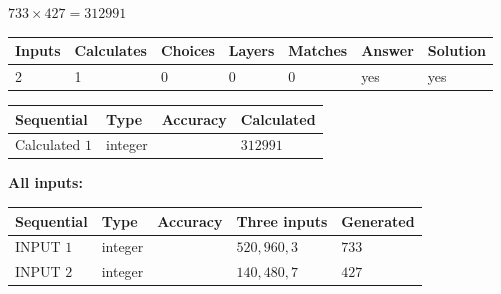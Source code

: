 \documentclass{ctexart}
\begin{document}
 

$ %
733 \times  %
427=   %
312991$
 
 
\noindent{}
 
 

 
   
   
   
   
\noindent\begin{tabular}{|l|l|l|l|l|l|l|}
 \hline
Inputs & Calculates & Choices & Layers & Matches & Answer & Solution \\ \hline
 2  & 
 1  & 
 0
  & 
 0  & 
 0  & 
  yes & 
  yes 
  \\ \hline
 \end{tabular}
   
   
   
   
\noindent{}
   
   
  
  
\noindent\begin{tabular}{|l|l|l|l|}
\hline
 Sequential & Type & Accuracy & Calculated \\ 
\hline
 
 
  Calculated $  1 $ & integer &  & 
  $ 312991 $ 
 \\  \hline  
 \end{tabular}
   
   
   
   
\noindent\vspace{0.1in}\hspace{-0.08in} {\textbf{\Large{All inputs: }}}
   
   
  
  
\noindent\begin{tabular}{|l|l|l|l|l|}
\hline
 Sequential & Type & Accuracy & Three inputs & Generated \\ 
\hline
 
 
  INPUT $  1 $ & integer &  & $
 520
 , 
 960
 , 
 3
 $ & $ 733 $ 
 \\  \hline  
 
 
  INPUT $  2 $ & integer &  & $
 140
 , 
 480
 , 
 7
 $ & $ 427 $ 
 \\  \hline  
 \end{tabular}
   
   
   
   
   
   
 \vspace{0.2in}
 
\end{document}
